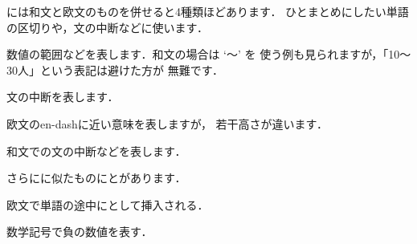 {には和文と欧文のものを併せると4種類ほどあります．%
ひとまとめにしたい単語の区切りや，文の中断などに使います．
\begin{description}
%
 \item[\Z{en-dash} \qu{--}] 
%
   数値の範囲などを表します．和文の場合は `〜' を
   使う例も見られますが，「10〜30人」という表記は避けた方が
   無難です．
 \item[\Z{em-dash} \qu{---}] 
   文の中断を表します．
%
 \item[\Z{全角ダーシ} \qu{—}]
   欧文のen-dashに近い意味を表しますが，
   若干高さが違います．
%
 \item[\Z{倍角ダーシ} \qu{\zdash}]
   和文での文の中断などを表します．
\end{description}
さらにに似たものにとがあります．
\begin{description}
%
 \item[ハイフン \qu{-}] 
   欧文で単語の途中にとして挿入される．
%
 \item[マイナス \qu{$-$}]
   数学記号で負の数値を表す．%
\end{description}

}

